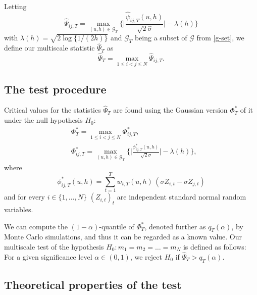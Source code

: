 \documentclass[a4paper,12pt]{article}
\numberwithin{equation}{section}
\begin{document}
Letting 
\[ \widehat{\Psi}_{ij,T} = \max_{(u,h) \in \mathcal{G}_T} \Big\{ \Big|\frac{\widehat{\psi}_{ij,T}(u,h)}{\sqrt{2}\widehat{\sigma}}\Big| - \lambda(h) \Big\} \] 
with $\lambda(h) = \sqrt{2 \log \{ 1/(2h) \}}$ and $\mathcal{G}_T$ being a subset of $\mathcal{G}$ from \eqref{g-set},
we define our multiscale statistic $\widehat{\Psi}_T$ as
\[ \widehat{\Psi}_T = \max_{1 \le i < j \le N} \widehat{\Psi}_{ij,T}. \]


\subsection{The test procedure}\label{subsec-test-equality-test}

Critical values for the statistics $\widehat{\Psi}_T$ are found using the Gaussian version $\Phi_T^*$ of it under the null hypothesis $H_0$:
\begin{align*}
&\Phi_T^* = \max_{1\le i < j \le N} \Phi_{ij, T}^*,\\
&\Phi_{ij, T}^* =  \max_{(u,h) \in \mathcal{G}_T} \Big\{ \Big|\frac{\phi_{ij,T}^*(u,h)}{\sqrt{2} \sigma}\Big| - \lambda(h) \Big\},
\end{align*} 
where
\[ \phi_{ij,T}^*(u,h) = \sum\limits_{t=1}^T w_{t,T}(u,h) \, (\sigma Z_{i,t} - \sigma Z_{j,t}) \]
and for every $i \in \{1, \ldots, N\}$ $(Z_{i,t})_t$ are independent standard normal random variables.
 
We can compute the $(1-\alpha)$-quantile of $\Phi_T^*$, denoted further as $q_T(\alpha)$, by Monte Carlo simulations, and thus it can be regarded as a known value. Our multiscale test of the hypothesis $H_0: m_1 = m_2 = \ldots = m_N$ is defined as follows: For a given significance level $\alpha \in (0,1)$, we reject $H_0$ if $\widehat{\Psi}_T > q_T(\alpha)$. 

\subsection{Theoretical properties of the test}\label{subsec-test-equality-theo}
\end{document}
